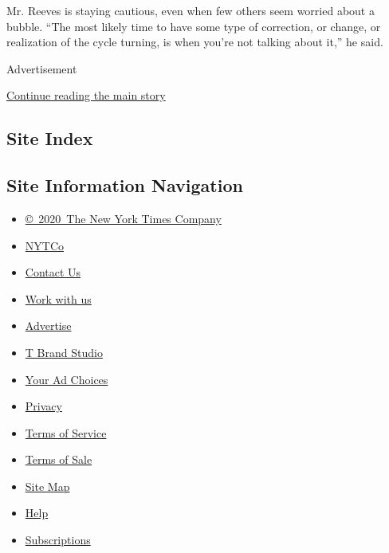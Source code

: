 Mr. Reeves is staying cautious, even when few others seem worried about
a bubble. ``The most likely time to have some type of correction, or
change, or realization of the cycle turning, is when you're not talking
about it,'' he said.

Advertisement

\protect\hyperlink{after-bottom}{Continue reading the main story}

\hypertarget{site-index}{%
\subsection{Site Index}\label{site-index}}

\hypertarget{site-information-navigation}{%
\subsection{Site Information
Navigation}\label{site-information-navigation}}

\begin{itemize}
\tightlist
\item
  \href{https://help.nytimes3xbfgragh.onion/hc/en-us/articles/115014792127-Copyright-notice}{©~2020~The
  New York Times Company}
\end{itemize}

\begin{itemize}
\tightlist
\item
  \href{https://www.nytco.com/}{NYTCo}
\item
  \href{https://help.nytimes3xbfgragh.onion/hc/en-us/articles/115015385887-Contact-Us}{Contact
  Us}
\item
  \href{https://www.nytco.com/careers/}{Work with us}
\item
  \href{https://nytmediakit.com/}{Advertise}
\item
  \href{http://www.tbrandstudio.com/}{T Brand Studio}
\item
  \href{https://www.nytimes3xbfgragh.onion/privacy/cookie-policy\#how-do-i-manage-trackers}{Your
  Ad Choices}
\item
  \href{https://www.nytimes3xbfgragh.onion/privacy}{Privacy}
\item
  \href{https://help.nytimes3xbfgragh.onion/hc/en-us/articles/115014893428-Terms-of-service}{Terms
  of Service}
\item
  \href{https://help.nytimes3xbfgragh.onion/hc/en-us/articles/115014893968-Terms-of-sale}{Terms
  of Sale}
\item
  \href{https://spiderbites.nytimes3xbfgragh.onion}{Site Map}
\item
  \href{https://help.nytimes3xbfgragh.onion/hc/en-us}{Help}
\item
  \href{https://www.nytimes3xbfgragh.onion/subscription?campaignId=37WXW}{Subscriptions}
\end{itemize}
